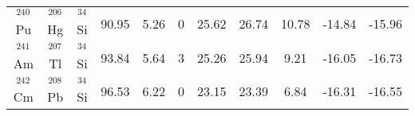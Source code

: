 \documentclass[preprint,10pt]{elsarticle}
\begin{document}
\begin{table*}[!htbp]
{\begin{tabular}{ccccccccccc}
$^{240}$Pu & $^{206}$Hg & $^{34}$Si &90.95  & 5.26& 0&25.62  & 26.74  & 10.78 &  -14.84 & -15.96 \\
$^{241}$Am & $^{207}$Tl & $^{34}$Si &93.84  & 5.64& 3&25.26  & 25.94  & 9.21  &  -16.05 & -16.73 \\
$^{242}$Cm & $^{208}$Pb & $^{34}$Si &96.53  & 6.22& 0&23.15  & 23.39  & 6.84  &  -16.31 & -16.55 \\
\hline
\end{tabular}}
\label{table-formulas}
\end{table*}
\end{document}

